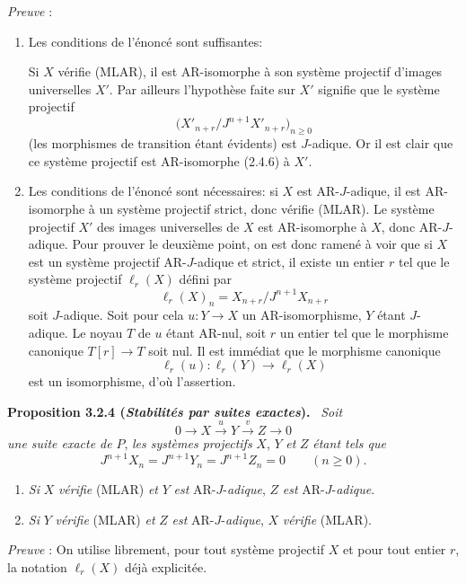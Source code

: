 \documentclass[11pt]{article}
\newenvironment{statement}[1]{\par\medskip\noindent\textbf{#1.}\ }{\par\medskip}
\begin{document}
\emph{Preuve} :
\begin{enumerate}[label=(\alph*)]
\item Les conditions de l'énoncé sont suffisantes:

Si $X$ vérifie (MLAR), il est AR-isomorphe à son système projectif d'images universelles $X'$. Par ailleurs l'hypothèse faite sur $X'$ signifie que le système projectif
\[
\bigl(X'_{n+r}/J^{n+1}X'_{n+r}\bigr)_{n\ge0}
\]
(les morphismes de transition étant évidents) est $J$-adique. Or il est clair que ce système projectif est AR-isomorphe (2.4.6) à $X'$.
\item Les conditions de l'énoncé sont nécessaires: si $X$ est AR-$J$-adique, il est AR-isomorphe à un système projectif strict, donc vérifie (MLAR). 
Le
système projectif $X'$ des images universelles de $X$ est AR-isomorphe à $X$, donc AR-$J$-adique. Pour prouver le deuxième point, on est donc ramené à voir que si $X$ est un système projectif AR-$J$-adique et strict, il existe un entier $r$ tel que le système projectif $\ell_r(X)$ défini par
\[
\ell_r(X)_n=X_{n+r}/J^{n+1}X_{n+r}
\]
soit $J$-adique. Soit pour cela $u:Y\to X$ un AR-isomorphisme, $Y$ étant $J$-adique. Le noyau $T$ de $u$ étant AR-nul, soit $r$ un entier tel que le morphisme canonique $T[r]\to T$ soit nul. Il est immédiat que le morphisme canonique
\[
\ell_r(u):\ell_r(Y)\longrightarrow\ell_r(X)
\]
est un isomorphisme, d'où l'assertion.
\end{enumerate}

\begin{statement}{Proposition 3.2.4 (\emph{Stabilités par suites exactes})}
\emph{Soit}
\[
0\longrightarrow X\stackrel{u}{\longrightarrow}Y\stackrel{v}{\longrightarrow}Z\longrightarrow0
\]
\emph{une suite exacte de} $P$, \emph{les systèmes projectifs} $X$, $Y$ \emph{et} $Z$ \emph{étant tels que}
\[
J^{n+1}X_n=J^{n+1}Y_n=J^{n+1}Z_n=0\qquad(n\ge0).
\]
\begin{enumerate}[label=(\roman*)]
\item \emph{Si} $X$ \emph{vérifie} (MLAR) \emph{et} $Y$ \emph{est} AR-$J$-\emph{adique}, $Z$ \emph{est} AR-$J$-\emph{adique}.
\item \emph{Si} $Y$ \emph{vérifie} (MLAR) \emph{et} $Z$ \emph{est} AR-$J$-\emph{adique}, $X$ \emph{vérifie} (MLAR).
\end{enumerate}
\end{statement}

\emph{Preuve} : On utilise librement, pour tout système projectif $X$ et pour tout entier $r$, la notation $\ell_r(X)$ déjà explicitée.
\end{document}
